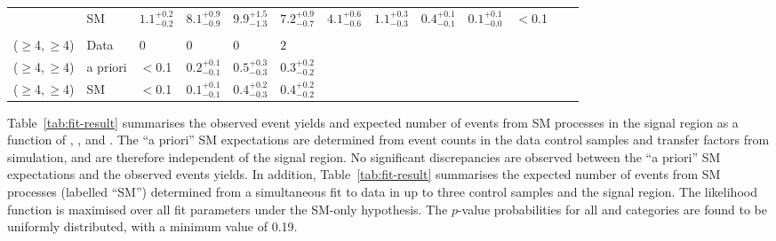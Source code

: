 \begin{table}[!t]
{\begin{tabular}{ lllllllllllll }
             & SM
             & $1.1^{+0.2}_{-0.2}$
             & $8.1^{+0.9}_{-0.9}$
             & $9.9^{+1.5}_{-1.3}$
             & $7.2^{+0.9}_{-0.7}$
             & $4.1^{+0.6}_{-0.6}$
             & $1.1^{+0.3}_{-0.3}$
             & $0.4^{+0.1}_{-0.1}$
             & $0.1^{+0.1}_{-0.0}$
             & $<$0.1                                   \\\\[-2ex]
    ($\geq$4,\,$\geq$4)
             & Data
             & $0$
             & $0$
             & $0$
             & $2$                                      \\
    ($\geq$4,\,$\geq$4)
             & a priori 
             & $<$0.1
             & $0.2^{+0.1}_{-0.1}$
             & $0.5^{+0.3}_{-0.3}$
             & $0.3^{+0.2}_{-0.2}$                      \\
    ($\geq$4,\,$\geq$4)
             & SM
             & $<$0.1
             & $0.1^{+0.1}_{-0.1}$
             & $0.4^{+0.2}_{-0.3}$
             & $0.4^{+0.2}_{-0.2}$                      \\

    \hline
  \end{tabular}
  }
\end{table}

Table~\ref{tab:fit-result} summarises the observed event yields and
expected number of events from SM processes in the signal region as a
function of \njet, \nb, and \scalht. The ``a priori'' SM expectations
are determined from event counts in the data control samples and
transfer factors from simulation, and are therefore independent of the
signal region. No significant discrepancies are observed between the
``a priori'' SM expectations and the observed events yields. In
addition, Table~\ref{tab:fit-result} summarises the expected number of
events from SM processes (labelled ``SM'') determined from a
simultaneous fit to data in up to three control samples and the signal
region. The likelihood function is maximised over all fit parameters
under the SM-only hypothesis. The $p$-value probabilities for all
\njet and \nb categories are found to be uniformly distributed, with a
minimum value of 0.19. 

